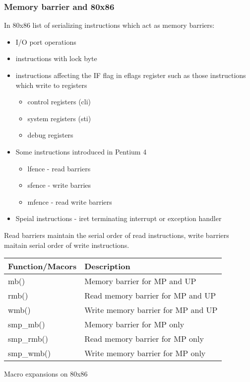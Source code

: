 \documentclass{article}
\begin{document}
\subsubsection{Memory barrier and 80x86}

  In 80x86 list of serializing instructions which act as memory
  barriers:


  \begin{itemize}
    \item I/O port operations
    \item instructions with lock byte
    \item instructions affecting the IF flag in eflags register such as those instructions which write to registers
      \begin{itemize}
        \item control registers (cli)
        \item system  registers (sti)
        \item debug   registers          
      \end {itemize}
    \item Some instructions introduced in Pentium 4
      \begin{itemize}
        \item lfence - read barriers
        \item sfence - write barries
        \item mfence - read write barriers
      \end{itemize}
    \item Speial instructions - iret terminating interrupt or exception handler                  
  \end{itemize}
  

Read barriers maintain the serial order of read instructions, write
barriers maitain serial order of write instructions.

\begin{center}
  \begin{tabular}{ l | l }    
    \hline
    Function/Macors & Description \\ \hline
    mb() & Memory barrier for MP and UP \\ 
    rmb() & Read memory barrier for MP and UP  \\ 
    wmb() &  Write memory barrier for MP and UP \\
    smp\_mb() &  Memory barrier for MP only \\
    smp\_rmb() &  Read memory barrier for MP only \\
    smp\_wmb() &  Write memory barrier for MP only \\
    \hline
  \end{tabular}
\end{center}
  Macro expansions on  80x86
\end{document}
